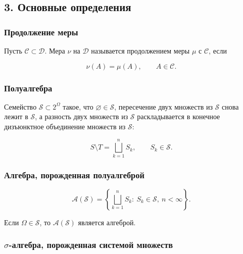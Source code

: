 \documentclass[
  11pt,
  a4paper,
]{article}
\begin{document}
\subsection{3. Основные
определения}\label{ux43eux441ux43dux43eux432ux43dux44bux435-ux43eux43fux440ux435ux434ux435ux43bux435ux43dux438ux44f}

\subsubsection{Продолжение
меры}\label{ux43fux440ux43eux434ux43eux43bux436ux435ux43dux438ux435-ux43cux435ux440ux44b}

Пусть \(\mathcal C\subset\mathcal D\). Мера \(\nu\) на \(\mathcal D\)
называется продолжением меры \(\mu\) с \(\mathcal C\), если

\[
\nu(A)=\mu(A),\qquad A\in\mathcal C.
\]

\subsubsection{Полуалгебра}\label{ux43fux43eux43bux443ux430ux43bux433ux435ux431ux440ux430}

Семейство \(\mathcal S\subset 2^\Omega\) такое, что
\(\varnothing\in\mathcal S\), пересечение двух множеств из
\(\mathcal S\) снова лежит в \(\mathcal S\), а разность двух множеств из
\(\mathcal S\) раскладывается в конечное дизъюнктное объединение
множеств из \(\mathcal S\):

\[
S\setminus T=\bigsqcup_{k=1}^n S_k,
\qquad S_k\in\mathcal S.
\]

\subsubsection{Алгебра, порожденная
полуалгеброй}\label{ux430ux43bux433ux435ux431ux440ux430-ux43fux43eux440ux43eux436ux434ux435ux43dux43dux430ux44f-ux43fux43eux43bux443ux430ux43bux433ux435ux431ux440ux43eux439}

\[
\mathcal A(\mathcal S)=
\left\{
\bigsqcup_{k=1}^n S_k:\ S_k\in\mathcal S,\ n<\infty
\right\}.
\]

Если \(\Omega\in\mathcal S\), то \(\mathcal A(\mathcal S)\) является
алгеброй.

\subsubsection{\texorpdfstring{\(\sigma\)-алгебра, порожденная системой
множеств}{\textbackslash sigma-алгебра, порожденная системой множеств}}\label{sigma-ux430ux43bux433ux435ux431ux440ux430-ux43fux43eux440ux43eux436ux434ux435ux43dux43dux430ux44f-ux441ux438ux441ux442ux435ux43cux43eux439-ux43cux43dux43eux436ux435ux441ux442ux432}
\end{document}
